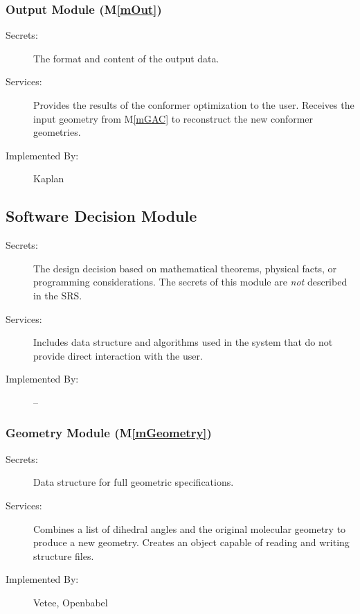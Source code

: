 \documentclass[12pt, titlepage]{article}
\newcommand{\mref}[1]{M\ref{#1}}
\newcommand{\progname}{Kaplan} %
\begin{document}
\subsubsection{Output Module (\mref{mOut})}

\begin{description}
	\item[Secrets:] The format and content of the output data.
	\item[Services:] Provides the results of the conformer optimization to the 
	user. Receives the input geometry from \mref{mGAC} to reconstruct the new 
	conformer geometries. 
	\item[Implemented By:] \progname{}
\end{description}

\subsection{Software Decision Module}

\begin{description}
\item[Secrets:] The design decision based on mathematical theorems, physical
  facts, or programming considerations. The secrets of this module are
  \emph{not} described in the SRS.
\item[Services:] Includes data structure and algorithms used in the system that
  do not provide direct interaction with the user. 
\item[Implemented By:] --
\end{description}

\subsubsection{Geometry Module (\mref{mGeometry})}
\begin{description}
	\item[Secrets:] Data structure for full geometric specifications.
	\item[Services:] Combines a list of dihedral angles and the original 
	molecular geometry to produce a new geometry. Creates an object capable of 
	reading and writing structure files.
	\item[Implemented By:] Vetee, Openbabel \citet{obabel} \citet{obabel-web}
\end{description}
\end{document}
